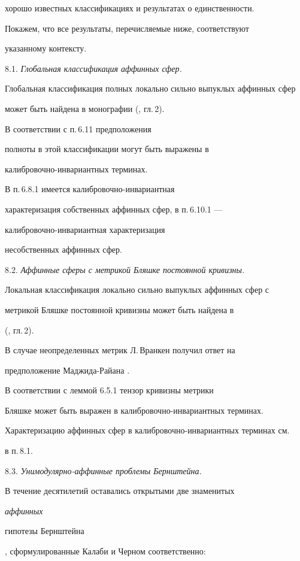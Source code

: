 хорошо известных классификациях и результатах о единственности.

Покажем, что все результаты, перечисляемые ниже, соответствуют

указанному контексту.

\medskip



8.1. {\it Глобальная классификация аффинных сфер.}

Глобальная классификация полных локально сильно выпуклых аффинных сфер

может быть найдена в  монографии (\cite{LI-S-Z-1}, гл.\,2).

В соответствии с п.\,6.11 предположения

полноты в этой классификации могут быть выражены в

калибровочно-инвариантных терминах.

В п.\,6.8.1 имеется калибровочно-инвариантная

характеризация собственных аффинных сфер, в п.\,6.10.1 ---

калибровочно-инвариантная характеризация

несобственных аффинных сфер.

\medskip



8.2. {\it Аффинные сферы с метрикой Бляшке постоянной кривизны.}

Локальная классификация локально сильно выпуклых аффинных сфер с

метрикой Бляшке постоянной кривизны может быть найдена в 

(\cite{LI-S-Z-1}, гл.\,2).

В случае неопределенных метрик Л.\,Вранкен получил ответ на

предположение Маджида-Райана \cite{VRA}.

В соответствии с леммой 6.5.1 тензор кривизны метрики

Бляшке может быть выражен в калибровочно-инвариантных терминах.

Характеризацию аффинных сфер в калибровочно-инвариантных терминах см.

в п.\,8.1.

\medskip



8.3. {\it Унимодулярно-аффинные проблемы Бернштейна.}

В течение десятилетий оставались открытыми две знаменитых {\it аффинных 

гипотезы Бернштейна}, сформулированные Калаби и Черном соответственно:

